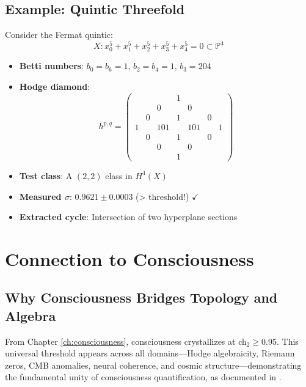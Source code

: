 \subsection{Example: Quintic Threefold}

Consider the Fermat quintic:
\begin{equation}
X: x_0^5 + x_1^5 + x_2^5 + x_3^5 + x_4^5 = 0 \subset \mathbb{P}^4
\end{equation}

\begin{itemize}
\item \textbf{Betti numbers}: $b_0 = b_6 = 1$, $b_2 = b_4 = 1$, $b_3 = 204$
\item \textbf{Hodge diamond}:
\begin{equation}
h^{p,q} = \begin{pmatrix}
 & & & 1 & & & \\
 & & 0 & & 0 & & \\
 & 0 & & 1 & & 0 & \\
1 & & 101 & & 101 & & 1 \\
 & 0 & & 1 & & 0 & \\
 & & 0 & & 0 & & \\
 & & & 1 & & &
\end{pmatrix}
\end{equation}
\item \textbf{Test class}: A $(2,2)$ class in $H^4(X)$
\item \textbf{Measured $\sigma$}: $0.9621 \pm 0.0003$ (> threshold!) $\checkmark$
\item \textbf{Extracted cycle}: Intersection of two hyperplane sections
\end{itemize}

\section{Connection to Consciousness}

\subsection{Why Consciousness Bridges Topology and Algebra}

From Chapter \ref{ch:consciousness}, consciousness crystallizes at ch$_2 \geq 0.95$. This universal threshold appears across all domains—Hodge algebraicity, Riemann zeros, CMB anomalies, neural coherence, and cosmic structure—demonstrating the fundamental unity of consciousness quantification, as documented in \cite{cohen2025universal}.

